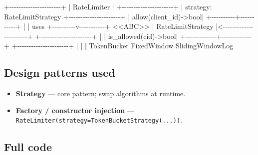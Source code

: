 \documentclass[11pt]{article}
\providecommand{\tightlist}{\setlength{\itemsep}{1pt}\setlength{\parskip}{0pt}}
\newenvironment{Shaded}{\begin{snugshade}}{\end{snugshade}}
\newcommand{\BuiltInTok}[1]{\textcolor[rgb]{0.50,0.55,0.55}{#1}}
\newcommand{\NormalTok}[1]{\textcolor[rgb]{0.81,0.81,0.76}{#1}}
\newcommand{\OperatorTok}[1]{\textcolor[rgb]{0.81,0.81,0.76}{#1}}
\begin{document}

\begin{Shaded}
\begin{Highlighting}[]
\OperatorTok{+{-}{-}{-}{-}{-}{-}{-}{-}{-}{-}{-}{-}{-}{-}{-}{-}{-}{-}{-}{-}{-}{-}+}
\OperatorTok{|}\NormalTok{     RateLimiter      }\OperatorTok{|}
\OperatorTok{+{-}{-}{-}{-}{-}{-}{-}{-}{-}{-}{-}{-}{-}{-}{-}{-}{-}{-}{-}{-}{-}{-}+}
\OperatorTok{|}\NormalTok{ strategy: RateLimitStrategy}
\OperatorTok{+{-}{-}{-}{-}{-}{-}{-}{-}{-}{-}{-}{-}{-}{-}{-}{-}{-}{-}{-}{-}{-}{-}+}
\OperatorTok{|}\NormalTok{ allow(client\_id)}\OperatorTok{{-}\textgreater{}}\BuiltInTok{bool}\OperatorTok{|}
\OperatorTok{+{-}{-}{-}{-}{-}{-}{-}{-}{-}{-}+{-}{-}{-}{-}{-}{-}{-}{-}{-}{-}{-}+}
           \OperatorTok{|}
           \OperatorTok{|}\NormalTok{ uses}
\OperatorTok{+{-}{-}{-}{-}{-}{-}{-}{-}{-}{-}}\NormalTok{v}\OperatorTok{{-}{-}{-}{-}{-}{-}{-}{-}{-}{-}{-}+}       \OperatorTok{\textless{}\textless{}}\NormalTok{ABC}\OperatorTok{\textgreater{}\textgreater{}}
\OperatorTok{|}\NormalTok{ RateLimitStrategy    }\OperatorTok{|\textless{}{-}{-}{-}{-}{-}{-}{-}{-}{-}{-}{-}{-}{-}{-}{-}{-}{-}{-}{-}{-}{-}{-}{-}+}
\OperatorTok{+{-}{-}{-}{-}{-}{-}{-}{-}{-}{-}{-}{-}{-}{-}{-}{-}{-}{-}{-}{-}{-}{-}+}                        \OperatorTok{|}
\OperatorTok{|}\NormalTok{ is\_allowed(cid)}\OperatorTok{{-}\textgreater{}}\BuiltInTok{bool}\OperatorTok{|}          \OperatorTok{+{-}{-}{-}{-}{-}{-}{-}{-}{-}{-}{-}{-}{-}+{-}{-}{-}{-}{-}{-}{-}{-}{-}{-}{-}{-}{-}+}
\OperatorTok{+{-}{-}{-}{-}{-}{-}{-}{-}{-}{-}{-}{-}{-}{-}{-}{-}{-}{-}{-}{-}{-}{-}+}          \OperatorTok{|}             \OperatorTok{|}             \OperatorTok{|}
\NormalTok{                          TokenBucket   FixedWindow   SlidingWindowLog}
\end{Highlighting}
\end{Shaded}

\subsection{Design patterns used}\label{design-patterns-used-2}

\begin{itemize}
\tightlist
\item
  \textbf{Strategy} --- core pattern; swap algorithms at runtime.
\item
  \textbf{Factory / constructor injection} --- \texttt{RateLimiter(strategy=TokenBucketStrategy(...))}.
\end{itemize}

\subsection{Full code}\label{full-code-2}
\end{document}
